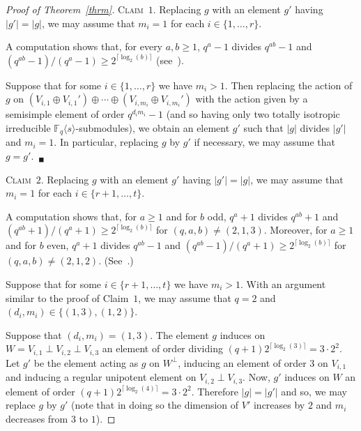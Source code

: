 \documentclass{amsart}
\begin{document}
\begin{proof}[Proof of Theorem~\ref{thrm}]
\smallskip

\noindent\textsc{Claim~$1$. }Replacing $g$ with an element $g'$ having $|g'|=|g|$, we may assume that $m_i=1$ for each $i\in \{1,\ldots,r\}$.

\smallskip

\noindent A computation shows that, for every $a,b\geq 1$, $q^{a}-1$ divides $q^{ab}-1$ and $(q^{ab}-1)/(q^a-1)\geq 2^{\lceil\log_2(b)\rceil}$ (see~\cite[Lemma~$2.4$~(i)]{DGPS}).

Suppose that for some $i\in\{1,\ldots,r\}$ we have $m_i>1$. Then replacing the action of 
$g$ on $(V_{i,1}\oplus V_{i,1}')\oplus \cdots\oplus (V_{i,m_i}\oplus V_{i,m_i}')$ with 
the action given by a semisimple element of order $q^{d_im_i}-1$ (and so having only 
two totally isotropic irreducible $\mathbb{F}_q\langle s\rangle$-submodules), 
we obtain an element  $g'$ such that $|g|$ divides $|g'|$ and  $m_i=1$. In particular, 
replacing $g$ by $g'$ if necessary, we may assume that $g=g'$.~$_\blacksquare$

\smallskip 

\noindent\textsc{Claim~$2$. }Replacing $g$ with an element $g'$ having $|g'|=|g|$, we may assume that $m_i=1$ for each $i\in \{r+1,\ldots,t\}$.

\smallskip 

\noindent  A computation shows that, for $a\geq 1$ and for $b$ odd, $q^{a}+1$ divides $q^{ab}+1$ and $(q^{ab}+1)/(q^a+1)\geq 2^{\lceil\log_2(b)\rceil}$ for $(q,a,b)\neq (2,1,3)$. Moreover, 
for $a\geq 1$ and for $b$ even, $q^{a}+1$ divides $q^{ab}-1$ and $(q^{ab}-1)/(q^a+1)\geq 2^{\lceil\log_2(b)\rceil}$ for $(q,a,b)\neq (2,1,2)$. (See~\cite[Lemma~$2.4$~(ii) and ~(iii)]{DGPS}.)

Suppose that for some $i\in\{r+1,\ldots,t\}$ we have $m_i>1$. With an argument similar to the proof of Claim~$1$, we may assume that $q=2$ and $(d_i,m_i)\in \{(1,3),(1,2)\}$.

Suppose that $(d_{i},m_{i})=(1,3)$. 
The element $g$ induces on $W=V_{i,1}\perp V_{i,2}\perp V_{i,3}$ an element of order 
dividing $(q+1)2^{\lceil \log_2(3)\rceil}=3\cdot 2^2$. 
Let $g'$ be the element acting as $g$ on $W^\perp$, inducing an element of order $3$ 
on $V_{i,1}$ and inducing a regular unipotent element on $V_{i,2}\perp V_{i,3}$. 
Now, $g'$ induces on $W$ an element of order $(q+1)2^{\lceil\log_2(4)\rceil}=3\cdot 2^2$. 
Therefore $|g|=|g'|$ and so, we may replace $g$ by $g'$ (note that in doing so the dimension 
of $V'$ increases by $2$ and $m_{i}$ decreases from $3$ to $1$). 


\end{proof}
\end{document}
